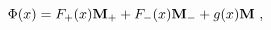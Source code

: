 \begin{equation}
\Phi (x) = F_+ (x) {\bf M_+} + F_- (x) {\bf M_-} + g(x) {\bf M}\ ,
\label{kinkexplicit2}
\end{equation}

